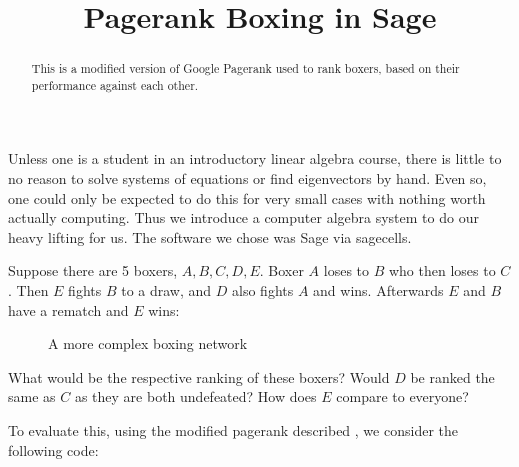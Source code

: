 \documentclass{ximera}
\title{Pagerank Boxing in Sage}
\begin{document}
      
\begin{abstract}
      
This is a modified version of Google Pagerank used to rank boxers, based on their performance against each other.

\end{abstract}
      
\maketitle

Unless one is a student in an introductory linear algebra course, there is little to no reason to solve systems of equations or find eigenvectors by hand.  Even so, one could only be expected to do this for very small cases with nothing worth actually computing.  Thus we introduce a computer algebra system to do our heavy lifting for us.  The software we chose was Sage via sagecells.

\begin{example}
Suppose there are 5 boxers, $A,B,C,D, E$.  Boxer $A$ loses to $B$ who then loses to $C$.  Then $E$ fights $B$ to a draw, and $D$ also fights $A$ and wins.  Afterwards $E$ and $B$ have a rematch and $E$ wins:
 
\begin{figure}[h]
\centering
{}
    \caption{A more complex boxing network}
    \label{complex}

\end{figure}

 
 What would be the respective ranking of these boxers? Would $D$ be ranked the same as $C$ as they are both undefeated?  How does $E$ compare to everyone?
 
 \end{example}
 
 To evaluate this, using the modified pagerank described , we consider the following code:
 
\end{document}

